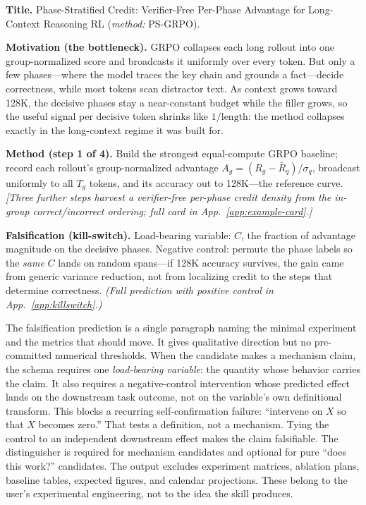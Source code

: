 \documentclass[10pt,a4paper]{article}
\begin{document}
\begin{tcolorbox}[breakable,colback=bgskill,colframe=cblue!70,fonttitle=\small,title={\textbf{A condensed generated card} \hfill \textit{held-out ICLR~2026 seed: RL for long-context reasoning}},before skip=6pt,after skip=6pt]
\small
\textbf{Title.} Phase-Stratified Credit: Verifier-Free Per-Phase Advantage for Long-Context Reasoning RL \;(\emph{method:} PS-GRPO).

\textbf{Motivation (the bottleneck).} GRPO collapses each long rollout into one group-normalized score and broadcasts it uniformly over every token. But only a few phases---where the model traces the key chain and grounds a fact---decide correctness, while most tokens scan distractor text. As context grows toward 128K, the decisive phases stay a near-constant budget while the filler grows, so the useful signal per decisive token shrinks like $1/\text{length}$: the method collapses exactly in the long-context regime it was built for.

\textbf{Method (step 1 of 4).} Build the strongest equal-compute GRPO baseline; record each rollout's group-normalized advantage $A_g = (R_g-\bar R_q)/\sigma_q$, broadcast uniformly to all $T_g$ tokens, and its accuracy out to 128K---the reference curve. \emph{[Three further steps harvest a verifier-free per-phase credit density from the in-group correct/incorrect ordering; full card in App.~\ref{app:example-card}.]}

\textbf{Falsification (kill-switch).} Load-bearing variable: $C$, the fraction of advantage magnitude on the decisive phases. Negative control: permute the phase labels so the \emph{same} $C$ lands on random spans---if 128K accuracy survives, the gain came from generic variance reduction, not from localizing credit to the steps that determine correctness. \emph{(Full prediction with positive control in App.~\ref{app:killswitch}.)}
\end{tcolorbox}

The falsification prediction is a single paragraph naming the minimal experiment and the metrics that should move. It gives qualitative direction but no pre-committed numerical thresholds. When the candidate makes a mechanism claim, the schema requires one \emph{load-bearing variable}: the quantity whose behavior carries the claim. It also requires a negative-control intervention whose predicted effect lands on the downstream task outcome, not on the variable's own definitional transform. This blocks a recurring self-confirmation failure: ``intervene on $X$ so that $X$ becomes zero.'' That tests a definition, not a mechanism. Tying the control to an independent downstream effect makes the claim falsifiable. The distinguisher is required for mechanism candidates and optional for pure ``does this work?'' candidates. The output excludes experiment matrices, ablation plans, baseline tables, expected figures, and calendar projections. These belong to the user's experimental engineering, not to the idea the skill produces.
\end{document}
